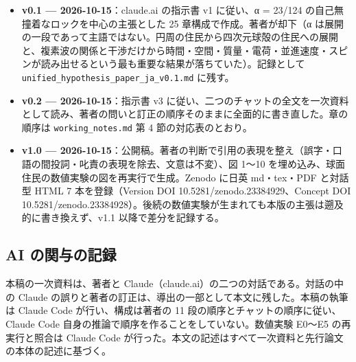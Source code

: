 \documentclass[
  a4paper,
]{ltjsarticle}
\providecommand{\tightlist}{%
  \setlength{\itemsep}{0pt}\setlength{\parskip}{0pt}}
\begin{document}
\begin{itemize}
\tightlist
\item
  \textbf{v0.1 --- 2026-10-15}：claude.ai の指示書 v1 に従い、α = 23/124
  の自己無撞着なロックを中心の主張とした 25 章構成で作成。著者が却下（α
  は展開の一段であって主語ではない。円周の住民から四次元球殻の住民への展開と、複素波の関係と干渉だけから時間・空間・質量・電荷・並進速度・スピンが読み出せるという最も重要な結果が落ちていた）。記録として
  \texttt{unified\_\allowbreak{}hypothesis\_\allowbreak{}paper\_\allowbreak{}ja\_\allowbreak{}v0.1.md} に残す。
\item
  \textbf{v0.2 --- 2026-10-15}：指示書 v3
  に従い、二つのチャットの全文を一次資料として読み、著者の問いと訂正の順序そのままに全面的に書き直した。章の順序は
  \texttt{working\_\allowbreak{}notes.md} 第 4 節の対応表のとおり。
\item
  \textbf{v1.0 ---
  2026-10-15}：公開稿。著者の判断で引用の表現を整え（誤字・口語の間投詞・叱責の表現を除去、文意は不変）、図
  1〜10 を埋め込み、球面住民の数値実験の図を再実行で生成。Zenodo に日英
  md・tex・PDF と対話型 HTML 7 本を登録（Version DOI
  10.5281/zenodo.23384929、Concept DOI
  10.5281/zenodo.23384928）。後続の数値実験が生まれても本版の主張は遡及的に書き換えず、v1.1
  以降で差分を記録する。
\end{itemize}

\subsection{AI
の関与の記録}\label{ai-ux306eux95a2ux4e0eux306eux8a18ux9332}

本稿の一次資料は、著者と
Claude（claude.ai）の二つの対話である。対話の中の Claude
の誤りと著者の訂正は、導出の一部として本文に残した。本稿の執筆は Claude
Code が行い、構成は著者の 11 段の順序とチャットの順序に従い、Claude Code
自身の推論で順序を作ることをしていない。数値実験 E0〜E5 の再実行と照合は
Claude Code
が行った。本文の記述はすべて一次資料と先行論文の本体の記述に基づく。
\end{document}

